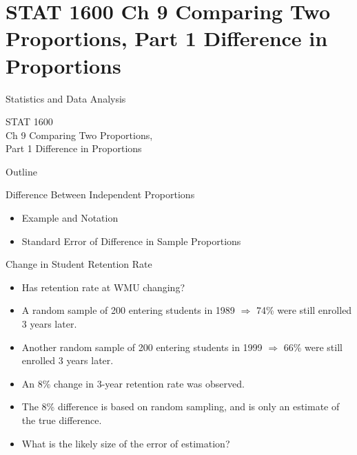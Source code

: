 \documentclass[14pt]{beamer}\usepackage[]{graphicx}\usepackage[]{color}
\begin{document}

\section{STAT 1600 Ch 9 Comparing Two Proportions,  Part 1 Difference in Proportions}

\begin{frame}[fragile]{Statistics and Data Analysis}

STAT 1600 \\ Ch 9 Comparing Two Proportions, \\ Part 1 Difference in Proportions

\end{frame}

\begin{frame}[fragile]{Outline}


Difference Between Independent Proportions  

\begin{itemize}
\item Example and Notation
\item Standard Error of Difference in Sample Proportions
\end{itemize}
\end{frame}

\begin{frame}[fragile]{Change in Student Retention Rate}

\begin{itemize}
\item<1-> Has retention rate at WMU  changing?
\item<2-> A random sample of 200 entering students in 1989 $\Rightarrow$ 74\% were  still enrolled 3 years later.
\item<3-> Another random sample of 200 entering students in 1999 $\Rightarrow$ 66\% were still enrolled 3 years later.
\item<4-> An 8\% change in 3-year retention rate was observed.
\item<5-> The 8\% difference is based on random sampling, and is only an  estimate of the true difference.
\item<6-> What is the likely size of the error of estimation?
\end{itemize}
\end{frame}
\end{document}
